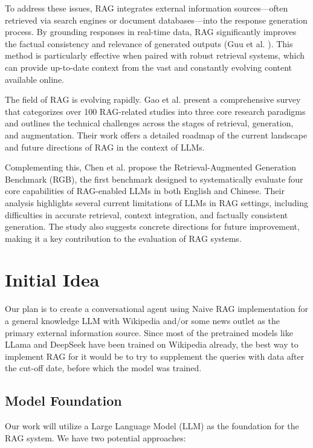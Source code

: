 \documentclass[fleqn,moreauthors,10pt]{ds_report}
\begin{document}
To address these issues, RAG integrates external information sources—often retrieved via search engines or document databases—into the response generation process. By grounding responses in real-time data, RAG significantly improves the factual consistency and relevance of generated outputs (Guu et al. \cite{guu}). This method is particularly effective when paired with robust retrieval systems, which can provide up-to-date context from the vast and constantly evolving content available online.

The field of RAG is evolving rapidly. Gao et al. \cite{gao} present a comprehensive survey that categorizes over 100 RAG-related studies into three core research paradigms and outlines the technical challenges across the stages of retrieval, generation, and augmentation. Their work offers a detailed roadmap of the current landscape and future directions of RAG in the context of LLMs.

Complementing this, Chen et al. \cite{chen} propose the Retrieval-Augmented Generation Benchmark (RGB), the first benchmark designed to systematically evaluate four core capabilities of RAG-enabled LLMs in both English and Chinese. Their analysis highlights several current limitations of LLMs in RAG settings, including difficulties in accurate retrieval, context integration, and factually consistent generation. The study also suggests concrete directions for future improvement, making it a key contribution to the evaluation of RAG systems.


\section*{Initial Idea}

Our plan is to create a conversational agent using Naive RAG implementation \cite{gao} for a general knowledge LLM with Wikipedia and/or some news outlet as the primary external information source. Since most of the pretrained models like LLama and DeepSeek have been trained on Wikipedia already, the best way to implement RAG for it would be to try to supplement the queries with data after the cut-off date, before which the model was trained.

\subsection*{Model Foundation}
Our work will utilize a Large Language Model (LLM) as the foundation for the RAG system. We have two potential approaches:
\end{document}
